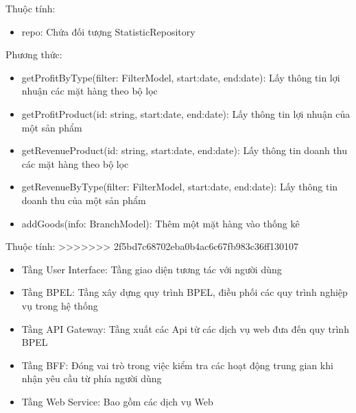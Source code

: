 Thuộc tính:
\begin{itemize}
	\item repo: Chứa đối tượng StatisticRepository
\end{itemize}
Phương thức:
\begin{itemize}
	\item getProfitByType(filter: FilterModel, start:date,
	      end:date): Lấy thông tin lợi nhuận các mặt hàng theo bộ lọc
	\item getProfitProduct(id: string, start:date,
	      end:date): Lấy thông tin lợi nhuận của một sản phẩm
	\item getRevenueProduct(id: string, start:date,
	      end:date): Lấy thông tin doanh thu các mặt hàng theo bộ lọc
	\item getRevenueByType(filter: FilterModel, start:date,
	      end:date): Lấy thông tin doanh thu của một sản phẩm
	\item addGoods(info: BranchModel): Thêm một mặt hàng vào thống kê
\end{itemize}

Thuộc tính:
>>>>>>> 2f5bd7c68702eba0b4ac6c67fb983c36ff130107
\begin{itemize}
	\item Tầng User Interface: Tầng giao diện tương tác với người dùng
	\item Tầng BPEL: Tầng xây dựng quy trình BPEL, điều phối các quy trình nghiệp vụ trong hệ thống
	\item Tầng API Gateway: Tầng xuất các Api từ các dịch vụ web đưa đến quy trình BPEL
	\item Tầng BFF: Đóng vai trò trong việc kiểm tra các hoạt động trung gian khi nhận yêu cầu từ phía người dùng
	\item Tầng Web Service: Bao gồm các dịch vụ Web
\end{itemize}

